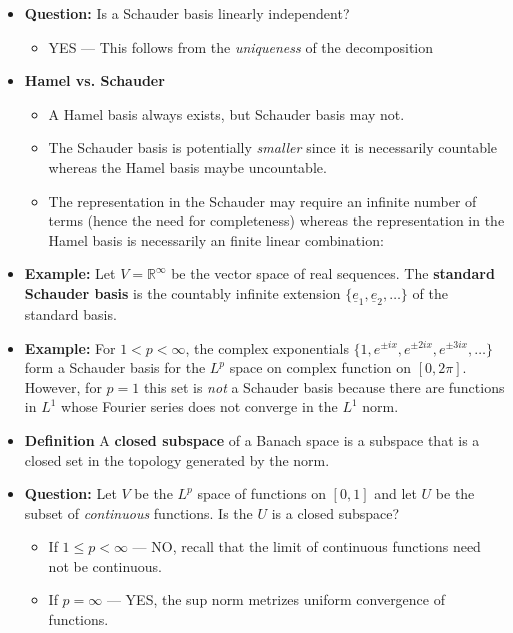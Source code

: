 \documentclass[11pt,twoside]{report}
\newcommand{\vecnot}{\underline}
\begin{document}
\begin{itemize}
\item \textbf{Question:} Is a Schauder basis linearly independent? 
\begin{itemize}
\item 
YES --- This follows from the  \emph{uniqueness} of the decomposition 
\end{itemize}



\item  \textbf{Hamel vs. Schauder} 
\begin{itemize}
\item A Hamel basis always exists, but Schauder basis may not.
\item  The Schauder basis is potentially  \emph{smaller} since it is necessarily countable whereas the Hamel basis maybe uncountable.
\item  The representation in the   Schauder may require an infinite number of terms (hence the need for completeness) whereas the representation in the Hamel basis is necessarily an finite linear combination: 
\end{itemize}

\item \textbf{Example:} Let $V = \mathbb{R}^\infty$ be the vector space of real sequences.
The \textbf{standard Schauder basis} is the countably infinite extension $\{\vecnot{e}_1 ,\vecnot{e}_2, \ldots \}$ of the standard basis.


\item \textbf{Example:}  For $1 < p < \infty$, the complex exponentials $\{ 1, e^{\pm ix}, e^{ \pm 2ix} , e^{ \pm 3 ix} , \dots\}$ form a  Schauder basis for the $L^p$ space on complex function on $[0, 2 \pi]$. However, for $p =1$ this set is \emph{not} a  Schauder basis because there are functions in $L^1$ whose Fourier series does not converge in the $L^1$ norm. 

\item \textbf{Definition}  A \textbf{closed subspace} of a Banach space is a subspace that is a closed set in the topology generated by the norm.


\item \textbf{Question: } Let $V$ be the $L^p$ space of functions on   $[0,1]$ and let $U$ be the subset of \emph{continuous} functions. Is the $U$ is a closed subspace? 
\begin{itemize}
\item  If $1 \le p < \infty$ --- NO, recall that the limit of continuous functions need not be continuous. 
\item If $p = \infty$ --- YES, the sup norm metrizes uniform convergence of functions. 
\end{itemize}




\end{itemize}
\end{document}
